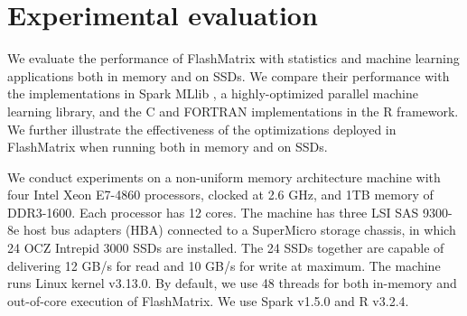\section{Experimental evaluation}
We evaluate the performance of FlashMatrix with statistics and machine learning
applications both in memory and on SSDs. We compare their performance with
the implementations in Spark MLlib \cite{mllib}, a highly-optimized parallel
machine learning library, and the C and FORTRAN implementations in the R framework.
We further illustrate the effectiveness of the optimizations deployed in
FlashMatrix when running both in memory and on SSDs.

We conduct experiments on a non-uniform memory architecture machine with
four Intel Xeon E7-4860 processors, clocked at 2.6 GHz, and 1TB memory of
DDR3-1600. Each processor has 12 cores. The machine has three LSI SAS 9300-8e
host bus adapters (HBA) connected to a SuperMicro storage chassis, in which
24 OCZ Intrepid 3000 SSDs are installed. The 24 SSDs together are capable of
delivering 12 GB/s for read and 10 GB/s for write at maximum. The machine runs
Linux kernel v3.13.0. By default, we use 48 threads for both in-memory and
out-of-core execution of FlashMatrix. We use Spark v1.5.0 and R v3.2.4.

